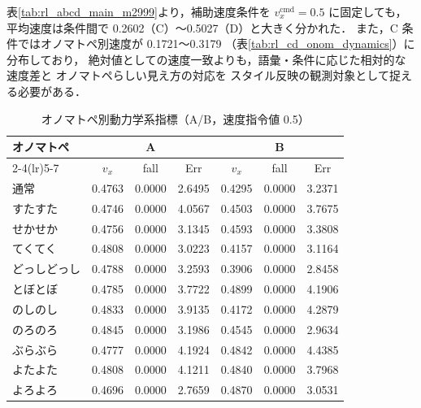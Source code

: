 表\ref{tab:rl_abcd_main_m2999}より，補助速度条件を $v_x^{\mathrm{cmd}}=0.5$ に固定しても，
平均速度は条件間で 0.2602（C）〜0.5027（D）と大きく分かれた．
また，C 条件ではオノマトペ別速度が 0.1721〜0.3179
（表\ref{tab:rl_cd_onom_dynamics}）に分布しており，
絶対値としての速度一致よりも，語彙・条件に応じた相対的な速度差と
オノマトペらしい見え方の対応を
スタイル反映の観測対象として捉える必要がある．

\begin{table}[H]
  \centering
  \caption{オノマトペ別動力学系指標（A/B，速度指令値 0.5）}
  \label{tab:rl_ab_onom_dynamics}
  \small
  \setlength{\tabcolsep}{3.5pt}
  \begin{tabular}{lccc ccc} \toprule
    \textbf{オノマトペ} &
    \multicolumn{3}{c}{\textbf{A}} &
    \multicolumn{3}{c}{\textbf{B}} \\ \cmidrule(lr){2-4}\cmidrule(lr){5-7}
    & $v_x$ & fall & Err & $v_x$ & fall & Err \\ \midrule
    通常 & 0.4763 & 0.0000 & 2.6495 & 0.4295 & 0.0000 & 3.2371 \\
    すたすた & 0.4746 & 0.0000 & 4.0567 & 0.4503 & 0.0000 & 3.7675 \\
    せかせか & 0.4756 & 0.0000 & 3.1345 & 0.4593 & 0.0000 & 3.3808 \\
    てくてく & 0.4808 & 0.0000 & 3.0223 & 0.4157 & 0.0000 & 3.1164 \\
    どっしどっし & 0.4788 & 0.0000 & 3.2593 & 0.3906 & 0.0000 & 2.8458 \\
    とぼとぼ & 0.4785 & 0.0000 & 3.7722 & 0.4899 & 0.0000 & 4.1906 \\
    のしのし & 0.4833 & 0.0000 & 3.9135 & 0.4172 & 0.0000 & 4.2879 \\
    のろのろ & 0.4845 & 0.0000 & 3.1986 & 0.4545 & 0.0000 & 2.9634 \\
    ぶらぶら & 0.4777 & 0.0000 & 4.1924 & 0.4842 & 0.0000 & 4.4385 \\
    よたよた & 0.4808 & 0.0000 & 4.1211 & 0.4840 & 0.0000 & 3.7968 \\
    よろよろ & 0.4696 & 0.0000 & 2.7659 & 0.4870 & 0.0000 & 3.0531 \\
    \bottomrule
  \end{tabular}
\end{table}

